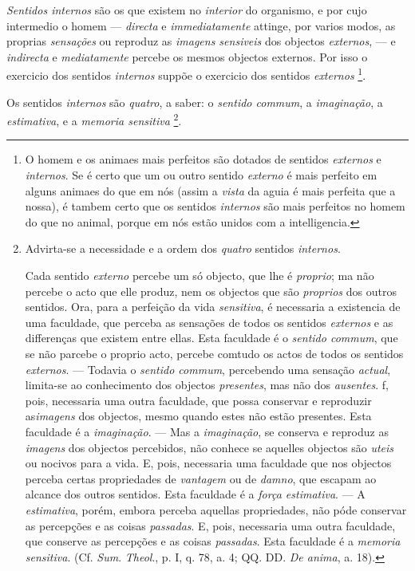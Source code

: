 \emph{Sentidos internos} são os que existem no \emph{interior} do organismo, e por cujo intermedio o homem --- \emph{directa} e \emph{immediatamente} attinge, por varios modos, as proprias \emph{sensações} ou reproduz as \emph{imagens sensiveis} dos objectos \emph{externos}, --- e \emph{indirecta} e \emph{mediatamente} percebe os mesmos objectos externos. Por isso o exercicio dos sentidos \emph{internos} suppõe o exercicio dos sentidos \emph{externos} \footnote{O homem e os animaes mais perfeitos são dotados de sentidos \emph{externos} e \emph{internos}. Se é certo que um ou outro sentido \emph{externo} é mais perfeito em alguns animaes do que em nós (assim a \emph{vista} da aguia é mais perfeita que a nossa), é tambem certo que os sentidos \emph{internos} são mais perfeitos no homem do que no animal, porque em nós estão unidos com a intelligencia.}.


Os sentidos \emph{internos} são \emph{quatro}, a saber: o \emph{sentido commum}, a \emph{imaginação}, a \emph{estimativa}, e a \emph{memoria sensitiva} \footnote{Advirta-se a necessidade e a ordem dos \emph{quatro} sentidos \emph{internos}.\par Cada sentido \emph{externo} percebe um só objecto, que lhe é \emph{proprio}; ma não percebe o acto que elle produz, nem os objectos que são \emph{proprios} dos outros sentidos. Ora, para a perfeição da vida \emph{sensitiva}, é necessaria a existencia de uma faculdade, que perceba as sensações de todos os sentidos \emph{externos} e as differenças que existem entre ellas. Esta faculdade é o \emph{sentido commum}, que se não parcebe o proprio acto, percebe comtudo os actos de todos os sentidos \emph{externos}. --- Todavia o \emph{sentido commum}, percebendo uma sensação \emph{actual}, limita-se ao conhecimento dos objectos \emph{presentes}, mas não dos \emph{ausentes}. f, pois, necessaria uma outra faculdade, que possa conservar e reproduzir as\emph{imagens} dos objectos, mesmo quando estes não estão presentes. Esta faculdade é a \emph{imaginação}. --- Mas a \emph{imaginação}, se conserva e reproduz as \emph{imagens} dos objectos percebidos, não conhece se aquelles objectos são \emph{uteis} ou nocivos para a vida. E, pois, necessaria uma faculdade que nos objectos perceba certas propriedades de \emph{vantagem} ou de \emph{damno}, que escapam ao alcance dos outros sentidos. Esta faculdade é a \emph{força estimativa}. --- A \emph{estimativa}, porém, embora perceba aquellas propriedades, não póde conservar as percepções e as coisas \emph{passadas}. E, pois, necessaria uma outra faculdade, que conserve as percepções e as coisas \emph{passadas}. Esta faculdade é a \emph{memoria sensitiva}. (Cf. \emph{Sum}. \emph{Theol}., p. I, q. 78, a. 4; QQ. DD. \emph{De anima}, a. 18).}.

